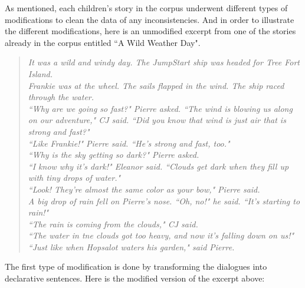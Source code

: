 As mentioned, each children's story in the corpus underwent different types of modifications to clean the data of any inconsistencies. And in order to illustrate the different modifications, here is an unmodified excerpt from one of the stories already in the corpus entitled ``A Wild Weather Day".

\begin{verse}
\itshape
It was a wild and windy day. The JumpStart ship was headed for Tree Fort Island. \\
Frankie was at the wheel. The sails flapped in the wind. The ship raced through the water. \\
``Why are we going so fast?" Pierre asked. ``The wind is blowing us along on our adventure," CJ said. ``Did you know that wind is just air that is strong and fast?" \\
``Like Frankie!" Pierre said. ``He's strong and fast, too." \\
``Why is the sky getting so dark?" Pierre asked. \\
``I know why it's dark!" Eleanor said. ``Clouds get dark when they fill up with tiny drops of water." \\
``Look! They're almost the same color as your bow," Pierre said. \\
A big drop of rain fell on Pierre's nose. ``Oh, no!" he said. ``It's starting to rain!" \\
``The rain is coming from the clouds," CJ said. \\
``The water in tne clouds got too heavy, and now it's falling down on us!" \\
``Just like when Hopsalot waters his garden," said Pierre. \\
\end{verse}

The first type of modification is done by transforming the dialogues into declarative sentences. Here is the modified version of the excerpt above:

